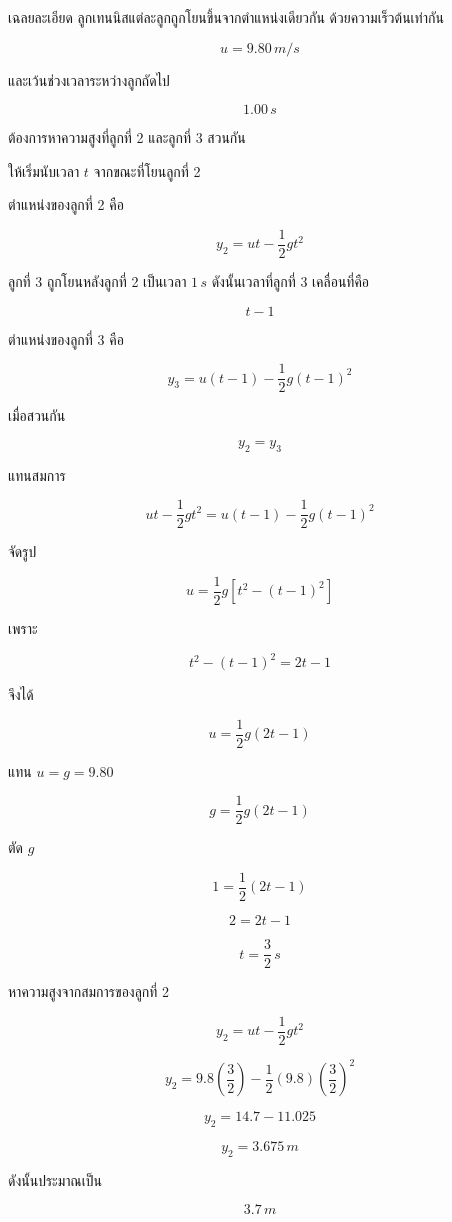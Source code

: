 \vspace{1em}
\begin{examplebox}{เฉลยละเอียด}
ลูกเทนนิสแต่ละลูกถูกโยนขึ้นจากตำแหน่งเดียวกัน ด้วยความเร็วต้นเท่ากัน

\[
u=9.80\,\si{m/s}
\]

และเว้นช่วงเวลาระหว่างลูกถัดไป

\[
1.00\,\si{s}
\]

ต้องการหาความสูงที่ลูกที่ 2 และลูกที่ 3 สวนกัน

ให้เริ่มนับเวลา $t$ จากขณะที่โยนลูกที่ 2

ตำแหน่งของลูกที่ 2 คือ

\[
y_2=ut-\frac{1}{2}gt^2
\]

ลูกที่ 3 ถูกโยนหลังลูกที่ 2 เป็นเวลา $1\,\si{s}$ ดังนั้นเวลาที่ลูกที่ 3 เคลื่อนที่คือ

\[
t-1
\]

ตำแหน่งของลูกที่ 3 คือ

\[
y_3=u(t-1)-\frac{1}{2}g(t-1)^2
\]

เมื่อสวนกัน

\[
y_2=y_3
\]

แทนสมการ

\[
ut-\frac{1}{2}gt^2
=
u(t-1)-\frac{1}{2}g(t-1)^2
\]

จัดรูป

\[
u=\frac{1}{2}g\left[t^2-(t-1)^2\right]
\]

เพราะ

\[
t^2-(t-1)^2=2t-1
\]

จึงได้

\[
u=\frac{1}{2}g(2t-1)
\]

แทน $u=g=9.80$

\[
g=\frac{1}{2}g(2t-1)
\]

ตัด $g$

\[
1=\frac{1}{2}(2t-1)
\]

\[
2=2t-1
\]

\[
t=\frac{3}{2}\,\si{s}
\]

หาความสูงจากสมการของลูกที่ 2

\[
y_2=ut-\frac{1}{2}gt^2
\]

\[
y_2=9.8\left(\frac{3}{2}\right)-\frac{1}{2}(9.8)\left(\frac{3}{2}\right)^2
\]

\[
y_2=14.7-11.025
\]

\[
y_2=3.675\,\si{m}
\]

ดังนั้นประมาณเป็น

\[
\boxed{3.7\,\si{m}}
\]
\end{examplebox}

